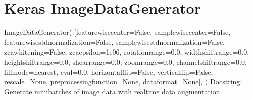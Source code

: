\documentclass[letterpaper,10pt,english]{sphinxmanual}
\begin{document}
\section{Keras ImageDataGenerator}
\label{\detokenize{03-Datasets:keras-imagedatagenerator}}
\begin{sphinxVerbatim}[commandchars=\\\{\}]
ImageDataGenerator(
    [\PYGZsq{}featurewise\PYGZus{}center=False\PYGZsq{}, \PYGZsq{}samplewise\PYGZus{}center=False\PYGZsq{}, \PYGZsq{}featurewise\PYGZus{}std\PYGZus{}normalization=False\PYGZsq{}, \PYGZsq{}samplewise\PYGZus{}std\PYGZus{}normalization=False\PYGZsq{}, \PYGZsq{}zca\PYGZus{}whitening=False\PYGZsq{}, \PYGZsq{}zca\PYGZus{}epsilon=1e\PYGZhy{}06\PYGZsq{}, \PYGZsq{}rotation\PYGZus{}range=0.0\PYGZsq{}, \PYGZsq{}width\PYGZus{}shift\PYGZus{}range=0.0\PYGZsq{}, \PYGZsq{}height\PYGZus{}shift\PYGZus{}range=0.0\PYGZsq{}, \PYGZsq{}shear\PYGZus{}range=0.0\PYGZsq{}, \PYGZsq{}zoom\PYGZus{}range=0.0\PYGZsq{}, \PYGZsq{}channel\PYGZus{}shift\PYGZus{}range=0.0\PYGZsq{}, \PYGZdq{}fill\PYGZus{}mode=\PYGZsq{}nearest\PYGZsq{}\PYGZdq{}, \PYGZsq{}cval=0.0\PYGZsq{}, \PYGZsq{}horizontal\PYGZus{}flip=False\PYGZsq{}, \PYGZsq{}vertical\PYGZus{}flip=False\PYGZsq{}, \PYGZsq{}rescale=None\PYGZsq{}, \PYGZsq{}preprocessing\PYGZus{}function=None\PYGZsq{}, \PYGZsq{}data\PYGZus{}format=None\PYGZsq{}],
)
Docstring:     
Generate minibatches of image data with real\PYGZhy{}time data augmentation.


\end{sphinxVerbatim}
\end{document}
